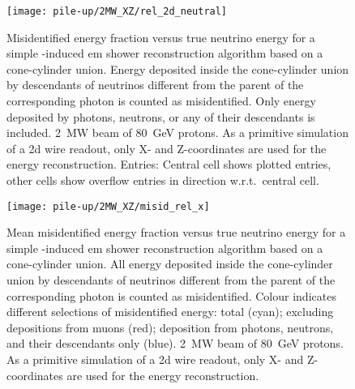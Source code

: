 \begin{figure}[tbp]
	\centering
	\texttt{[image: pile-up/2MW\_XZ/rel\_2d\_neutral]}
	\caption[Pile-up study misidentified fractional vs.\ true neutrino energy, only neutrals, \SI{2}{\mega\watt} beam, XZ projection]{%
		Misidentified energy fraction versus true neutrino energy for a simple \Pgpz-induced \acrshort{em} shower reconstruction algorithm based on a cone-cylinder union.
		Energy deposited inside the cone-cylinder union by descendants of neutrinos different from the parent of the corresponding \Pgpz photon is counted as misidentified.
		Only energy deposited by photons, neutrons, or any of their descendants is included.
		\SI{2}{\mega\watt} beam of \SI{80}{\giga\electronvolt} protons.
		As a primitive simulation of a \acrshort{2d} wire readout, only X- and Z-coordinates are used for the energy reconstruction.
		Entries: Central cell shows plotted entries, other cells show overflow entries in direction w.r.t.\ central cell.
	}
\end{figure}

\begin{figure}[tbp]
	\centering
	\texttt{[image: pile-up/2MW\_XZ/misid\_rel\_x]}
	\caption[Pile-up study mean misidentified fractional vs.\ true neutrino energy, \SI{2}{\mega\watt} beam, XZ projection]{%
		Mean misidentified energy fraction versus true neutrino energy for a simple \Pgpz-induced \acrshort{em} shower reconstruction algorithm based on a cone-cylinder union.
		All energy deposited inside the cone-cylinder union by descendants of neutrinos different from the parent of the corresponding \Pgpz photon is counted as misidentified.
		Colour indicates different selections of misidentified energy: total (cyan); excluding depositions from muons (red); deposition from photons, neutrons, and their descendants only (blue).
		\SI{2}{\mega\watt} beam of \SI{80}{\giga\electronvolt} protons.
		As a primitive simulation of a \acrshort{2d} wire readout, only X- and Z-coordinates are used for the energy reconstruction.
	}
\end{figure}

